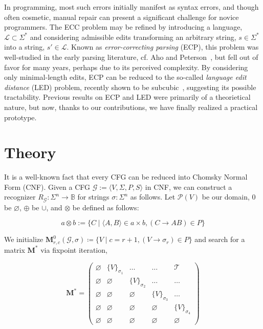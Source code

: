 \documentclass[sigplan,nonacm]{acmart}\settopmatter{printfolios=false,printccs=false,printacmref=false}
\begin{document}
In programming, most such errors initially manifest as syntax errors, and though often cosmetic, manual repair can present a significant challenge for novice programmers. The ECC problem may be refined by introducing a language, $\mathcal{L} \subset \Sigma^*$ and considering admissible edits transforming an arbitrary string, $s \in \Sigma^*$ into a string, $s'\in\mathcal{L}$. Known as \textit{error-correcting parsing} (ECP), this problem was well-studied in the early parsing literature, cf. Aho and Peterson~\cite{aho1972minimum}, but fell out of favor for many years, perhaps due to its perceived complexity. By considering only minimal-length edits, ECP can be reduced to the so-called \textit{language edit distance} (LED) problem, recently shown to be subcubic~\cite{bringmann2019truly}, suggesting its possible tractability. Previous results on ECP and LED were primarily of a theorietical nature, but now, thanks to our contributions, we have finally realized a practical prototype.

%

\section{Theory}

It is a well-known fact that every CFG can be reduced into Chomsky Normal Form (CNF). Given a CFG $\mathcal{G} := \langle V, \Sigma, P, S\rangle$ in CNF, we can construct a recognizer $R_\mathcal{G}: \Sigma^n \rightarrow \mathbb{B}$ for strings $\sigma: \Sigma^n$ as follows. Let $\mathcal P(V)$ be our domain, $0$ be $\varnothing$, $\oplus$ be $\cup$, and $\otimes$ be defined as follows:

\vspace{-7pt}
\[
a \otimes b := \{C \mid \langle A, B\rangle \in a \times b, (C\rightarrow AB) \in P\}
\]

\noindent We initialize $\mathbf{M}^0_{r,c}(\mathcal{G}, \sigma) \coloneqq \{V \mid c = r + 1, (V \rightarrow \sigma_r) \in P\}$ and search for a matrix $\mathbf{M}^*$ via fixpoint iteration,

\vspace{-5}
\[
\mathbf{M}^* = \begin{pmatrix}
            \varnothing & \{V\}_{\sigma_1} & \ldots & \ldots & \mathcal{T} \\
            \varnothing & \varnothing & \{V\}_{\sigma_2} & \ldots & \ldots \\
            \varnothing & \varnothing & \varnothing & \{V\}_{\sigma_3} & \ldots \\
            \varnothing & \varnothing & \varnothing & \varnothing & \{V\}_{\sigma_4} \\
            \varnothing & \varnothing & \varnothing & \varnothing & \varnothing
\end{pmatrix}
\]
\end{document}
